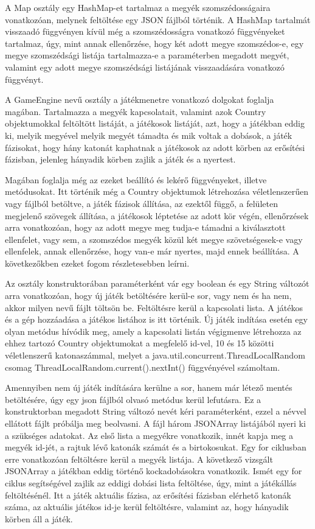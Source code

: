 A Map osztály egy HashMap-et tartalmaz a megyék szomszédosságaira vonatkozóan, melynek feltöltése egy JSON fájlból történik. A HashMap tartalmát visszaadó függvényen kívül még a szomszédosságra vonatkozó függvényeket tartalmaz, úgy, mint annak ellenőrzése, hogy két adott megye szomszédos-e, egy megye szomszédsági listája tartalmazza-e a paraméterben megadott megyét, valamint egy adott megye szomszédsági listájának visszaadására vonatkozó függvényt. 

A GameEngine nevű osztály a játékmenetre vonatkozó dolgokat foglalja magában. Tartalmazza a megyék kapcsolatait, valamint azok Country objektumokkal feltöltött listáját, a játékosok listáját, azt, hogy a játékban eddig ki, melyik megyével melyik megyét támadta és mik voltak a dobások, a játék fázisokat, hogy hány katonát kaphatnak a játékosok az adott körben az erősítési fázisban, jelenleg hányadik körben zajlik a játék és a nyertest. 

Magában foglalja még az ezeket beállító és lekérő függvényeket, illetve metódusokat. Itt történik még a Country objektumok létrehozása véletlenszerűen vagy fájlból betöltve, a játék fázisok állítása, az ezektől függő, a felületen megjelenő szövegek állítása, a játékosok léptetése az adott kör végén, ellenőrzések arra vonatkozóan, hogy az adott megye meg tudja-e támadni a kiválasztott ellenfelet, vagy sem, a szomszédos megyék közül két megye szövetségesek-e vagy ellenfelek, annak ellenőrzése, hogy van-e már nyertes, majd ennek beállítása. A következőkben ezeket fogom részletesebben leírni. 

Az osztály konstruktorában paraméterként vár egy boolean és egy String változót arra vonatkozóan, hogy új játék betöltésére kerül-e sor, vagy nem és ha nem, akkor milyen nevű fájlt töltsön be. Feltöltésre kerül a kapcsolati lista. A játékos és a gép hozzáadása a játékos listához is itt történik. Új játék indítása esetén egy olyan metódus hívódik meg, amely a kapcsolati listán végigmenve létrehozza az ehhez tartozó Country objektumokat a megfelelő id-vel, 10 és 15 közötti véletlenszerű katonaszámmal, melyet a java.util.concurrent.ThreadLocalRandom csomag ThreadLocalRandom.current().nextInt() függvényével számoltam. 

Amennyiben nem új játék indítására kerülne a sor, hanem már létező mentés betöltésére, úgy egy json fájlból olvasó metódus kerül lefutásra. Ez a konstruktorban megadott String változó nevét kéri paraméterként, ezzel a névvel ellátott fájlt próbálja meg beolvasni. A fájl három JSONArray listájából nyeri ki a szükséges adatokat. Az első lista a megyékre vonatkozik, innét kapja meg a megyék id-jét, a rajtuk lévő katonák számát és a birtokosukat. Egy for ciklusban erre vonatkozóan feltöltésre kerül a megyék listája. A következő vizsgált JSONArray a játékban eddig történő kockadobásokra vonatkozik. Ismét egy for ciklus segítségével zajlik az eddigi dobási lista feltöltése, úgy, mint a játékállás feltöltésénél. Itt a játék aktuális fázisa, az erősítési fázisban elérhető katonák száma, az aktuális játékos id-je kerül feltöltésre, valamint az, hogy hányadik körben áll a játék. 

